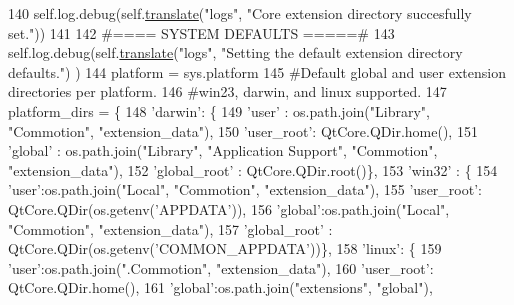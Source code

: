 \begin{DoxyCode}
{{{140         self.log.debug(self.\hyperlink{classcommotion__client_1_1utils_1_1extension__manager_1_1ExtensionManager_a2cfd032ca383c3fd6f0f52b99b6dd67c}{translate}(\textcolor{stringliteral}{"logs"}, \textcolor{stringliteral}{"Core extension directory succesfully set."}))
141 
142         \textcolor{comment}{#==== SYSTEM DEFAULTS =====#}
143         self.log.debug(self.\hyperlink{classcommotion__client_1_1utils_1_1extension__manager_1_1ExtensionManager_a2cfd032ca383c3fd6f0f52b99b6dd67c}{translate}(\textcolor{stringliteral}{"logs"}, \textcolor{stringliteral}{"Setting the default extension directory defaults."})
      )
144         platform = sys.platform
145         \textcolor{comment}{#Default global and user extension directories per platform.}
146         \textcolor{comment}{#win23, darwin, and linux supported.}
147         platform\_dirs = \{
148             \textcolor{stringliteral}{'darwin'}: \{
149                 \textcolor{stringliteral}{'user'} : os.path.join(\textcolor{stringliteral}{"Library"}, \textcolor{stringliteral}{"Commotion"}, \textcolor{stringliteral}{"extension\_data"}),
150                 \textcolor{stringliteral}{'user\_root'}: QtCore.QDir.home(),
151                 \textcolor{stringliteral}{'global'} : os.path.join(\textcolor{stringliteral}{"Library"}, \textcolor{stringliteral}{"Application Support"}, \textcolor{stringliteral}{"Commotion"}, \textcolor{stringliteral}{"extension\_data"}),
152                 \textcolor{stringliteral}{'global\_root'} : QtCore.QDir.root()\},
153             \textcolor{stringliteral}{'win32'} : \{
154                 \textcolor{stringliteral}{'user'}:os.path.join(\textcolor{stringliteral}{"Local"}, \textcolor{stringliteral}{"Commotion"}, \textcolor{stringliteral}{"extension\_data"}),
155                 \textcolor{stringliteral}{'user\_root'}: QtCore.QDir(os.getenv(\textcolor{stringliteral}{'APPDATA'})),
156                 \textcolor{stringliteral}{'global'}:os.path.join(\textcolor{stringliteral}{"Local"}, \textcolor{stringliteral}{"Commotion"}, \textcolor{stringliteral}{"extension\_data"}),
157                 \textcolor{stringliteral}{'global\_root'} : QtCore.QDir(os.getenv(\textcolor{stringliteral}{'COMMON\_APPDATA'}))\},
158             \textcolor{stringliteral}{'linux'}: \{
159                 \textcolor{stringliteral}{'user'}:os.path.join(\textcolor{stringliteral}{".Commotion"}, \textcolor{stringliteral}{"extension\_data"}),
160                 \textcolor{stringliteral}{'user\_root'}: QtCore.QDir.home(),
161                 \textcolor{stringliteral}{'global'}:os.path.join(\textcolor{stringliteral}{"extensions"}, \textcolor{stringliteral}{"global"}),
}}}
\end{DoxyCode}
